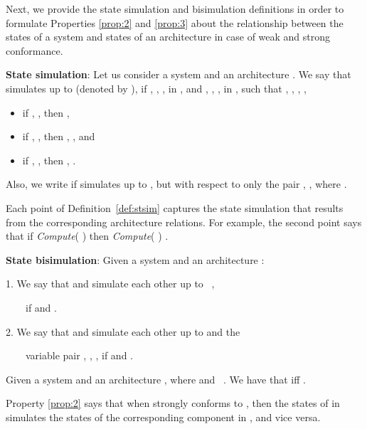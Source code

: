 \documentclass{llncs}
\begin{document}
Next, we provide the state simulation and bisimulation definitions in order to formulate 
Properties \ref{prop:2} and \ref{prop:3} about the relationship between the states of a system and 
states of an architecture in case of weak and strong conformance.
 
\begin{ttd}
\label{def:stsim}
\textbf{State simulation}: Let us consider a system  and an architecture .  We say that    simulates    up to  (denoted by    ), if  , , ,  in , and  , , ,  in , such that   ,   ,   ,   ,     
\begin{itemize}
\item if  ,     , then    ,    \mbox{ } 

\item if  ,
        , then    ,         , and

\item if  ,         , then  ,          .    
      
\end{itemize}

\noindent Also, we write    if  simulates  up to , but with respect to only the pair , , where   .
\end{ttd}

Each point of Definition~\ref{def:stsim} captures the state simulation that  
results from the corresponding architecture relations. 
For example, the second point says that if  \textit{Compute}(  )   then 
 \textit{Compute}(  )  .         

\begin{ttd}
\label{def:stbisim}
\textbf{State bisimulation}: Given a system  and an architecture : 

1. We say that    and    simulate each other up to  \mbox{  }, 

\ \ \ \ if    and  
 . 

2. We say that    and    simulate each other up to  and the 

\ \ \ \ variable pair , ,   , if    and  
 .   
\end{ttd}

\begin{ttp} 
\label{prop:2}
Given a system  and an architecture , where    and \mbox{  }. We have that    iff   .
\end{ttp}

Property \ref{prop:2} says that when  strongly conforms to , then the states of  in  simulates 
the states of the corresponding component  in , and vice versa. 
\end{document}
